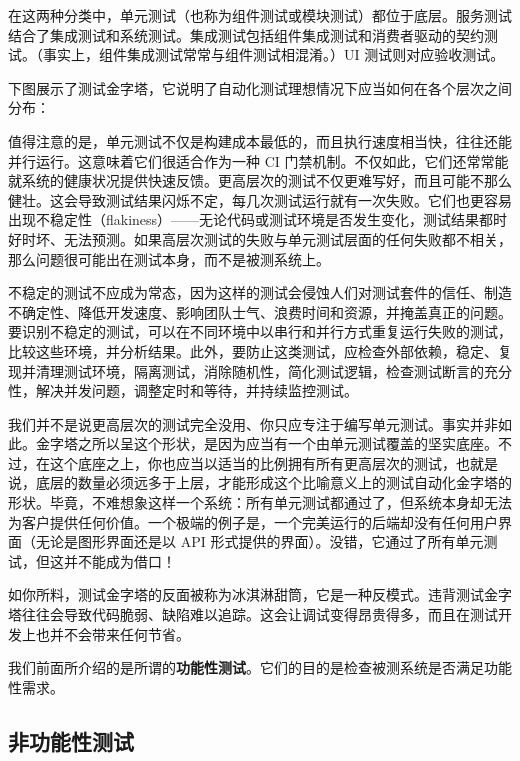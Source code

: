 \label{idx:786}
\label{idx:787}
\label{idx:788}
\label{idx:789}
在这两种分类中，单元测试（也称为组件测试或模块测试）都位于底层。服务测试结合了集成测试和系统测试。集成测试包括组件集成测试和消费者驱动的契约测试。（事实上，组件集成测试常常与组件测试相混淆。）UI 测试则对应验收测试。

下图展示了测试金字塔，它说明了自动化测试理想情况下应当如何在各个层次之间分布：


值得注意的是，单元测试不仅是构建成本最低的，而且执行速度相当快，往往还能并行运行。这意味着它们很适合作为一种 CI 门禁机制。不仅如此，它们还常常能就系统的健康状况提供快速反馈。更高层次的测试不仅更难写好，而且可能不那么健壮。这会导致测试结果闪烁不定，每几次测试运行就有一次失败。它们也更容易出现不稳定性（flakiness）——无论代码或测试环境是否发生变化，测试结果都时好时坏、无法预测。如果高层次测试的失败与单元测试层面的任何失败都不相关，那么问题很可能出在测试本身，而不是被测系统上。

不稳定的测试不应成为常态，因为这样的测试会侵蚀人们对测试套件的信任、制造不确定性、降低开发速度、影响团队士气、浪费时间和资源，并掩盖真正的问题。要识别不稳定的测试，可以在不同环境中以串行和并行方式重复运行失败的测试，比较这些环境，并分析结果。此外，要防止这类测试，应检查外部依赖，稳定、复现并清理测试环境，隔离测试，消除随机性，简化测试逻辑，检查测试断言的充分性，解决并发问题，调整定时和等待，并持续监控测试。

\label{idx:790}
我们并不是说更高层次的测试完全没用、你只应专注于编写单元测试。事实并非如此。金字塔之所以呈这个形状，是因为应当有一个由单元测试覆盖的坚实底座。不过，在这个底座之上，你也应当以适当的比例拥有所有更高层次的测试，也就是说，底层的数量必须远多于上层，才能形成这个比喻意义上的测试自动化金字塔的形状。毕竟，不难想象这样一个系统：所有单元测试都通过了，但系统本身却无法为客户提供任何价值。一个极端的例子是，一个完美运行的后端却没有任何用户界面（无论是图形界面还是以 API 形式提供的界面）。没错，它通过了所有单元测试，但这并不能成为借口！

\label{idx:791}
如你所料，测试金字塔的反面被称为冰淇淋甜筒，它是一种反模式。违背测试金字塔往往会导致代码脆弱、缺陷难以追踪。这会让调试变得昂贵得多，而且在测试开发上也并不会带来任何节省。

\label{idx:792}
我们前面所介绍的是所谓的\textbf{功能性测试}。它们的目的是检查被测系统是否满足功能性需求。

\subsection{非功能性测试}

